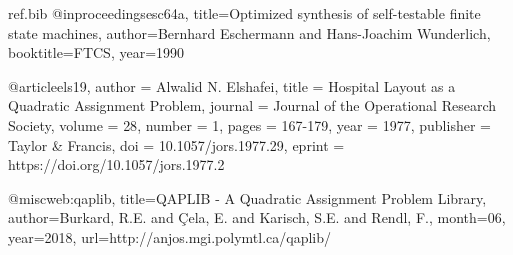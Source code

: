 \begin{filecontents*}{ref.bib}
@inproceedings{esc64a,
  title={Optimized synthesis of self-testable finite state machines},
  author={Bernhard Eschermann and Hans-Joachim Wunderlich},
  booktitle={FTCS},
  year={1990}
}

@article{els19,
    author = {Alwalid N. Elshafei},
    title = {Hospital Layout as a Quadratic Assignment Problem},
    journal = {Journal of the Operational Research Society},
    volume = {28},
    number = {1},
    pages = {167-179},
    year  = {1977},
    publisher = {Taylor & Francis},
    doi = {10.1057/jors.1977.29},
    eprint = {https://doi.org/10.1057/jors.1977.2}
}


@misc{web:qaplib,
  title={QAPLIB - A Quadratic Assignment Problem Library},
  author={Burkard, R.E. and Çela, E. and Karisch, S.E. and Rendl, F.},
  month={06},
  year={2018},
  url={http://anjos.mgi.polymtl.ca/qaplib/}
}
\end{filecontents*}

\documentclass[12pt]{report}
\usepackage[a4paper]{geometry}
\usepackage[myheadings]{fullpage}
\usepackage{fancyhdr}
\usepackage{lastpage}
\usepackage{graphicx, wrapfig, subcaption, setspace, booktabs, epstopdf}
\usepackage[T1]{fontenc}
\usepackage[utf8]{inputenc}
\usepackage[font=small, labelfont=bf]{caption}
\usepackage{fourier}
\usepackage[protrusion=true, expansion=true]{microtype}
\usepackage[spanish]{babel}
\usepackage{sectsty}
\usepackage{url, lipsum}
\usepackage{amsmath}
\usepackage{listings}
\usepackage{color}

\usepackage{mathtools}
\DeclarePairedDelimiter\ceil{\lceil}{\rceil}
\DeclarePairedDelimiter\floor{\lfloor}{\rfloor}


\usepackage[bibencoding=auto,backend=biber,autolang=other]{biblatex}
\usepackage{csquotes}


\renewcommand{\lstlistingname}{Código}
\renewcommand{\lstlistlistingname}{Lista de \lstlistingname s}


\newcommand{\HRule}[1]{\rule{\linewidth}{#1}}
\onehalfspacing
\setcounter{tocdepth}{5}
\setcounter{secnumdepth}{5}

